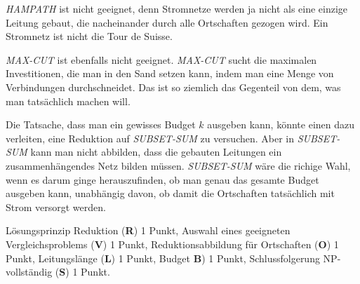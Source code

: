 \begin{diskussion}
\textsl{HAMPATH} ist nicht geeignet, denn Stromnetze werden ja nicht als eine einzige
Leitung gebaut, die nacheinander durch alle Ortschaften gezogen wird. Ein Stromnetz
ist nicht die Tour de Suisse.

\textsl{MAX-CUT} ist ebenfalls nicht geeignet. \textsl{MAX-CUT} sucht die maximalen
Investitionen, die man in den Sand setzen kann, indem man eine Menge von Verbindungen
durchschneidet. Das ist so ziemlich das Gegenteil von dem, was man tatsächlich machen
will.

Die Tatsache, dass man ein gewisses Budget $k$ ausgeben kann, könnte einen dazu
verleiten, eine Reduktion auf \textsl{SUBSET-SUM} zu versuchen. Aber in
\textsl{SUBSET-SUM} kann man nicht abbilden, dass die gebauten Leitungen ein
zusammenhängendes Netz bilden müssen. \textsl{SUBSET-SUM} wäre die richige
Wahl, wenn es darum ginge herauszufinden, ob man genau das gesamte Budget ausgeben
kann, unabhängig davon, ob damit die Ortschaften tatsächlich mit Strom versorgt
werden.
\end{diskussion}

\begin{bewertung}
Lösungsprinzip Reduktion ({\bf R}) 1 Punkt,
Auswahl eines geeigneten Vergleichsproblems ({\bf V}) 1 Punkt,
Reduktionsabbildung für Ortschaften ({\bf O}) 1 Punkt,
Leitungslänge ({\bf L}) 1 Punkt,
Budget {\bf B}) 1 Punkt,
Schlussfolgerung NP-vollständig ({\bf S}) 1 Punkt.
\end{bewertung}

